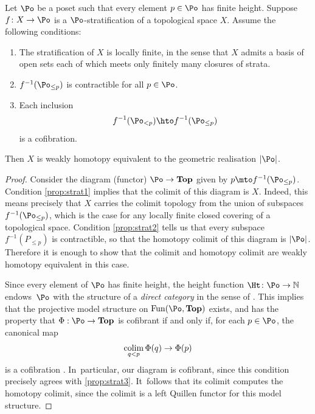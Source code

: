 \begin{prop}\label{prop:strat}
Let $\Po$ be a poset such that every element $p \in \Po$ has finite height. Suppose $f \colon X \to \Po$ is a $\Po$-stratification of a topological space $X$. Assume the following conditions:
\begin{enumerate}
\item\label{prop:strat1} The stratification of $X$ is locally finite, in the sense that $X$ admits a basis of open sets each of which meets only finitely many closures of strata.
\item\label{prop:strat2} $f^{-1}(\Po_{\leq p})$ is contractible for all $p \in \Po$.
\item\label{prop:strat3} Each inclusion
\[
f^{-1}(\Po_{<p}) \hto f^{-1}(\Po_{\leq p})
\]
is a cofibration.
\end{enumerate}
Then $X$ is weakly homotopy equivalent to the geometric realisation $|\Po|$.
\end{prop}

\begin{proof}
Consider the diagram (\ie functor) $\Po \to \mathbf{Top}$ given by $p \mto f^{-1}(\Po_{\leq p})$. Condition \eqref{prop:strat1} implies that the colimit of this diagram is $X$. Indeed, this means precisely that $X$ carries the colimit topology from the union of subspaces $f^{-1}(\Po_{\leq p})$, which is the case for any locally finite closed covering of a topological space. Condition \eqref{prop:strat2} tells us that every subspace $f^{-1}(P_{\leq p})$ is contractible, so that the homotopy colimit of this diagram is $|\Po|$. Therefore it is enough to show that the colimit and homotopy colimit are weakly homotopy equivalent in this case.

Since every element of $\Po$ has finite height, the height function $\Ht \colon \Po \to \mathbb{N}$ endows~$\Po$ with the structure of a \emph{direct category} in the sense of \cite[\S5.1]{hovey}. This implies that the projective model structure on $\mathrm{Fun}(\Po,\mathbf{Top})$ exists, and has the property that $\Phi :\Po \to \mathbf{Top}$ is cofibrant if and only if, for each $p \in \Po$, the canonical map\vspace*{-3pt}
\[
\operatornamewithlimits{colim}_{q<p} \Phi(q) \to \Phi(p)
\]
is a cofibration \cite[Th.\,5.1.3]{hovey}. In~particular, our diagram is cofibrant, since this condition precisely agrees with \eqref{prop:strat3}. It~follows that its colimit computes the homotopy colimit, since the colimit is a left Quillen functor for this model structure.\end{proof}

